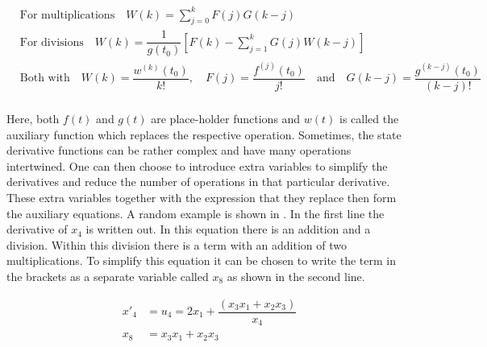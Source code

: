 
\begin{equation} \label{eq:rec_rel}
\begin{split}
&\text{For multiplications} \quad W\left(k\right)=\displaystyle\sum_{j=0}^{k}F\left(j\right)G\left(k-j\right)\\
&\text{For divisions} \quad W\left(k\right)=\dfrac{1}{g\left(t_{0}\right)}\left[F\left(k\right)-\displaystyle\sum_{j=1}^{k} G\left(j\right)W\left(k-j\right)\right]\\
& \text{Both with} \quad W\left(k\right)=\dfrac{w^{\left(k\right)}\left(t_{0}\right)}{k!}, \quad F\left(j\right)=\dfrac{f^{\left(j\right)}\left(t_{0}\right)}{j!} \quad \text{and} \quad G\left(k-j\right)=\dfrac{g^{\left(k-j\right)}\left(t_{0}\right)}{\left(k-j\right)!}\\
\end{split}
\end{equation}

\noindent
Here, both $f\left(t\right)$ and $g\left(t\right)$ are place-holder functions and $w\left(t\right)$ is called the auxiliary function which replaces the respective operation. Sometimes, the state derivative functions can be rather complex and have many operations intertwined. One can then choose to introduce extra variables to simplify the derivatives and reduce the number of operations in that particular derivative. These extra variables together with the expression that they replace then form the auxiliary equations. A random example is shown in . In the first line the derivative of $x_{4}$ is written out. In this equation there is an addition and a division. Within this division there is a term with an addition of two multiplications. To simplify this equation it can be chosen to write the term in the brackets as a separate variable called $x_{8}$ as shown in the second line.

\begin{equation} \label{eq:auxEqExample}
\begin{split}
x'_{4} &= u_{4} = 2x_{1}+\dfrac{\left(x_{3}x_{1}+x_{2}x_{3}\right)}{x_{4}} \\
x_{8} &= x_{3}x_{1}+x_{2}x_{3} \\
\end{split}
\end{equation}

